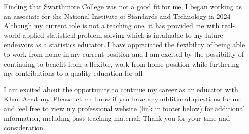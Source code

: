 \documentclass[11pt,a4paper,sans]{moderncv}
\begin{document}
	Finding that Swarthmore College was not a good fit for me, I began working as an associate for the National Institute of Standards and Technology in 2024. Although my current role is not a teaching one, it has provided me with real-world applied statistical problem solving which is invaluable to my future endeavors as a statistics educator. I have appreciated the flexibility of being able to work from home in my current position and I am excited by the possibility of continuing to benefit from a flexible, work-from-home position while furthering my contributions to a quality education for all. 
	
	I am excited about the opportunity to continue my career as an educator with Khan Academy. Please let me know if you have any additional questions for me and feel free to view my professional website (link in footer below) for additional information, including past teaching material. Thank you for your time and consideration.\\
	
	\vspace{3mm}
	
	\makeletterclosing
	
\end{document}

